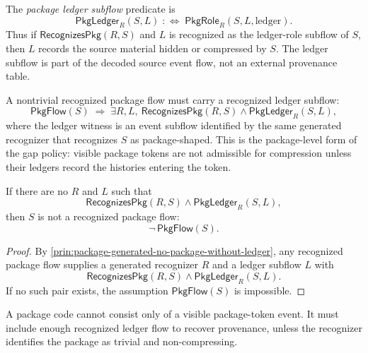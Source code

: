 \begin{definition}
\label{def:package-generated-ledger-subflow}
The \emph{package ledger subflow} predicate is
$$
  \mathsf{PkgLedger}_{R}(S,L)
  \;:\Longleftrightarrow\;
  \mathsf{PkgRole}_{R}(S,L,\mathrm{ledger}).
$$
Thus if $\mathsf{RecognizesPkg}(R,S)$ and $L$ is recognized as the ledger-role subflow of $S$, then $L$ records the source material hidden or compressed by $S$. The ledger subflow is part of the decoded source event flow, not an external provenance table.
\end{definition}

\begin{principle}
\label{prin:package-generated-no-package-without-ledger}
A nontrivial recognized package flow must carry a recognized ledger subflow:
$$
  \mathsf{PkgFlow}(S)
  \;\Longrightarrow\;
  \exists R,L,\ \mathsf{RecognizesPkg}(R,S) \wedge \mathsf{PkgLedger}_{R}(S,L),
$$
where the ledger witness is an event subflow identified by the same generated recognizer that recognizes $S$ as package-shaped. This is the package-level form of the gap policy: visible package tokens are not admissible for compression unless their ledgers record the histories entering the token.
\end{principle}

\begin{theorem}
\label{thm:package-generated-visible-code-insufficient}
If there are no $R$ and $L$ such that
$$
  \mathsf{RecognizesPkg}(R,S)
  \wedge
  \mathsf{PkgLedger}_{R}(S,L),
$$
then $S$ is not a recognized package flow:
$$
  \neg\,\mathsf{PkgFlow}(S).
$$
\end{theorem}

\begin{proof}
By \autoref{prin:package-generated-no-package-without-ledger}, any recognized package flow supplies a generated recognizer $R$ and a ledger subflow $L$ with
$$
  \mathsf{RecognizesPkg}(R,S)
  \wedge
  \mathsf{PkgLedger}_{R}(S,L).
$$
If no such pair exists, the assumption $\mathsf{PkgFlow}(S)$ is impossible.
\end{proof}

\begin{corollary}
\label{cor:package-generated-not-merely-visible-token}
A package code cannot consist only of a visible package-token event. It must include enough recognized ledger flow to recover provenance, unless the recognizer identifies the package as trivial and non-compressing.
\end{corollary}

